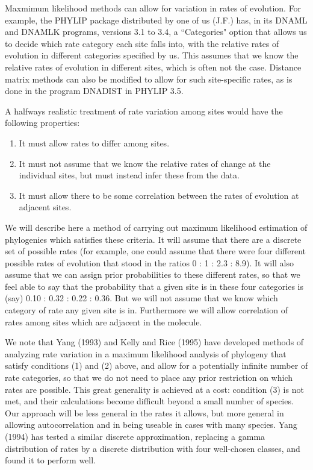 \documentclass[12pt]{article}
\begin{document}
Maxmimum likelihood methods can allow for variation in rates of
evolution.  For example, the PHYLIP package distributed by one of
us (J.F.) has, in its DNAML and DNAMLK programs, versions 3.1 to 3.4, 
a ``Categories" option
that allows us to decide which rate category each site falls
into, with the relative rates of evolution in different categories
specified by us.  This assumes that we know the relative
rates of evolution in different sites, which is often not the case.
Distance matrix methods can also be modified to allow for such site-specific
rates, as is done in the program DNADIST in PHYLIP 3.5.

A halfways realistic treatment of rate variation among sites would
have the following properties:
\begin{enumerate}
\item It must allow rates to differ among sites.
\item It must not assume that we know the relative rates
of change at the individual sites, but must instead infer these
from the data.
\item It must allow there to be some correlation between the
rates of evolution at adjacent sites.
\end{enumerate}

We will describe here a method of carrying out maximum likelihood
estimation of phylogenies which satisfies these criteria.  It
will assume that there are a discrete set of possible rates (for
example, one could assume that there were four different possible
rates of evolution that stood in the ratios 0 : 1 : 2.3 : 8.9).  It will
also assume that we can assign prior probabilities to these different
rates, so that we feel able to say that the probability that a given
site is in these four categories is (say) 0.10 : 0.32 : 0.22 : 0.36.  But
we will not assume that we know which category of rate any
given site is in.  Furthermore we will allow correlation of rates among
sites which are adjacent in the molecule.

We note that Yang (1993) and Kelly and Rice (1995) have developed methods of
analyzing rate
variation in a maximum likelihood analysis of phylogeny that satisfy
conditions (1) and (2) above, and allow for a potentially infinite
number of rate categories, so that we do not need to place any
prior restriction on which rates are possible.  This great generality is
achieved at a cost: condition (3) is not met, and their calculations
become difficult beyond a small number of species.  Our approach will
be less general in the rates it allows, but more general in allowing
autocorrelation and in being useable in cases with many species.  Yang (1994)
has tested a similar discrete approximation, replacing a gamma
distribution of rates by a discrete distribution with four well-chosen
classes, and found it to perform well.
\end{document}
